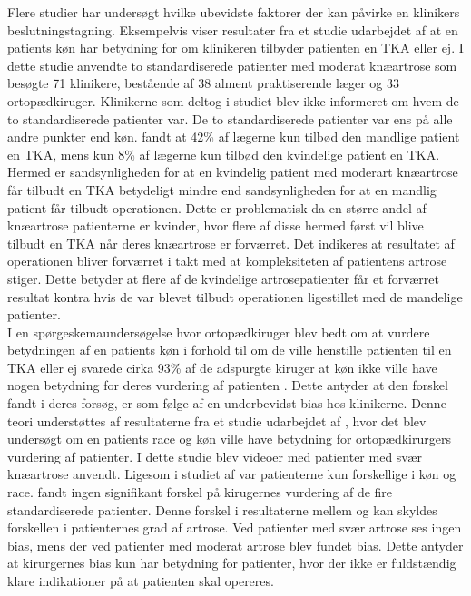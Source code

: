 Flere studier har undersøgt hvilke ubevidste faktorer der kan påvirke en klinikers beslutningstagning. Eksempelvis viser resultater fra et studie udarbejdet af \cite{borkhoff2008} at en patients køn har betydning for om klinikeren tilbyder patienten en TKA eller ej. I dette studie anvendte \cite{borkhoff2008} to standardiserede patienter med moderat knæartrose som besøgte 71 klinikere, bestående af 38 alment praktiserende læger og 33 ortopædkiruger. Klinikerne som deltog i studiet blev ikke informeret om hvem de to standardiserede patienter var. De to standardiserede patienter var ens på alle andre punkter end køn. \cite{borkhoff2008} fandt at 42\% af lægerne kun tilbød den mandlige patient en TKA, mens kun 8\% af lægerne kun tilbød den kvindelige patient en TKA. Hermed er sandsynligheden for at en kvindelig patient med moderart knæartrose får tilbudt en TKA betydeligt mindre end sandsynligheden for at en mandlig patient får tilbudt operationen. Dette er problematisk da en større andel af knæartrose patienterne er kvinder, hvor flere af disse hermed først vil blive tilbudt en TKA når deres knæartrose er forværret. Det indikeres at resultatet af operationen bliver forværret i takt med at kompleksiteten af patientens artrose stiger. Dette betyder at flere af de kvindelige artrosepatienter får et forværret resultat kontra hvis de var blevet tilbudt operationen ligestillet med de mandelige patienter. \citep{borkhoff2008} \\
I en spørgeskemaundersøgelse hvor ortopædkiruger blev bedt om at vurdere betydningen af en patients køn i forhold til om de ville henstille patienten til en TKA eller ej svarede cirka 93\% af de adspurgte kiruger at køn ikke ville have nogen betydning for deres vurdering af patienten \citep{wright1995}. Dette antyder at den forskel \cite{borkhoff2008} fandt i deres forsøg, er som følge af en underbevidst bias hos klinikerne. Denne teori understøttes af resultaterne fra et studie udarbejdet af \cite{dy2014}, hvor det blev undersøgt om en patients race og køn ville have betydning for ortopædkirurgers vurdering af patienter. I dette studie blev videoer med patienter med svær knæartrose anvendt. Ligesom i studiet af \cite{borkhoff2008} var patienterne kun forskellige i køn og race. \cite{dy2014} fandt ingen signifikant forskel på kirugernes vurdering af de fire standardiserede patienter. Denne forskel i resultaterne mellem \cite{borkhoff2008} og \cite{dy2014} kan skyldes forskellen i patienternes grad af artrose. Ved patienter med svær artrose ses ingen bias, mens der ved patienter med moderat artrose blev fundet bias. Dette antyder at kirurgernes bias kun har betydning for patienter, hvor der ikke er fuldstændig klare indikationer på at patienten skal opereres. \\
